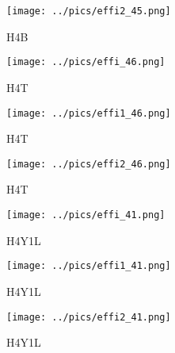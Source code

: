 \documentclass[10pt, xcolor={dvipsnames}, aspectratio = 169]{beamer}
\begin{document}
\begin{frame}

\begin{figure}
\centering
\texttt{[image: ../pics/effi2\_45.png]}
\caption{H4B}
\end{figure}

\end{frame}

\begin{frame}

\begin{figure}
\centering
\texttt{[image: ../pics/effi\_46.png]}
\caption{H4T}
\end{figure}

\end{frame}


\begin{frame}

\begin{figure}
\centering
\texttt{[image: ../pics/effi1\_46.png]}
\caption{H4T}
\end{figure}

\end{frame}


\begin{frame}

\begin{figure}
\centering
\texttt{[image: ../pics/effi2\_46.png]}
\caption{H4T}
\end{figure}

\end{frame}

\begin{frame}

\begin{figure}
\centering
\texttt{[image: ../pics/effi\_41.png]}
\caption{H4Y1L}
\end{figure}

\end{frame}


\begin{frame}

\begin{figure}
\centering
\texttt{[image: ../pics/effi1\_41.png]}
\caption{H4Y1L}
\end{figure}

\end{frame}


\begin{frame}

\begin{figure}
\centering
\texttt{[image: ../pics/effi2\_41.png]}
\caption{H4Y1L}
\end{figure}

\end{frame}
\end{document}
